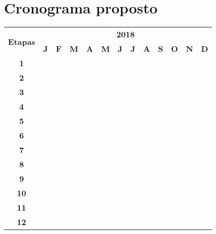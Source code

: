 \section{Cronograma proposto}
\label{cro}

\vspace{0.5cm}
{\tiny
\noindent \begin{tabular}{|c||c|c|c|c|c|c|c|c|c|c|c|c|}
  \hline
  \multirow{2}{*}{\textbf{\small{Etapas}}} & \multicolumn{12}{|c||}{\textbf{\small{2018}}} \\
  \cline{2-13}
   & \textbf{J} & \textbf{F} & \textbf{M} & \textbf{A} & \textbf{M} & \textbf{J} & \textbf{J} & \textbf{A} & \textbf{S} & \textbf{O} & \textbf{N} & \textbf{D} \\
  \hline \hline
  \textbf{\small{1}} & & & \cellcolor{black} & & & & & & & & & \\ \hline
  \textbf{\small{2}} & & & \cellcolor{black} & \cellcolor{black} & & & & & & & & \\ \hline
  \textbf{\small{3}} & & & & \cellcolor{black} & & & & & & & & \\ \hline
  \textbf{\small{4}} & & & & \cellcolor{black} & \cellcolor{black} & & & & & & & \\ \hline
  \textbf{\small{5}} & & & & & \cellcolor{black} & \cellcolor{black} & & & & & & \\ \hline
  \textbf{\small{6}} & & & \cellcolor{black} & \cellcolor{black} & \cellcolor{black} & \cellcolor{black} & & & & & & \\ \hline
  \textbf{\small{7}} & & & & & & & \cellcolor{black} & & & & & \\ \hline
  \textbf{\small{8}} & & & & & & & \cellcolor{black} & & & & & \\ \hline
  \textbf{\small{9}} & & & & & & & & \cellcolor{black} & & & & \\ \hline
  \textbf{\small{10}} & & & & & & & & & \cellcolor{black} & & & \\ \hline
  \textbf{\small{11}} & & & & & & & & & \cellcolor{black} & \cellcolor{black} & & \\ \hline
  \textbf{\small{12}} & & & & & & & \cellcolor{black} & \cellcolor{black} & \cellcolor{black} & \cellcolor{black} & \cellcolor{black} & \\ \hline
\end{tabular}
}
